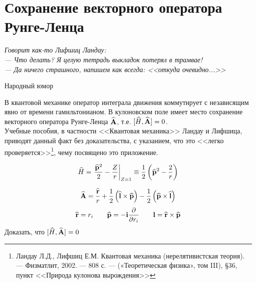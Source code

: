 \chapter{Сохранение векторного оператора Рунге-Ленца}
\label{runge}

\renewcommand{\thesection}{}
\renewcommand{\theequation}{\arabic{equation}}

\hfill \begin{minipage}[h]{0.65\textwidth}
\textit{
Говорит как-то Лифшиц Ландау:\\ 
--- Что делать? Я целую тетрадь выкладок потерял в трамвае!\\
--- Да ничего страшного, напишем как всегда: <<откуда очевидно...>>}
\begin{flushright}
Народный юмор
\end{flushright}
\end{minipage}
\vspace{0.5cm}

В квантовой механике оператор интеграла движения коммутирует с независящим явно от времени гамильтонианом. В кулоновском поле имеет место сохранение векторного оператора Рунге-Ленца $\widehat{\mathbf{A}}$, т.е. $[\widehat{H},\widehat{\mathbf{A}}] = 0$. \\
Учебные пособия, в частности <<Квантовая механика>> Ландау и Лифшица, приводят данный факт без доказательства, с указанием, что это <<легко проверяется>>\footnote{Ландау Л.Д., Лифшиц Е.М. Квантовая механика (нерелятивистская теория). — Физматлит, 2002. — 808 с. — («Теоретическая физика», том III), \S 36, пункт <<Природа кулонова вырождения>>}, чему посвящено это приложение.

\begin{stmt*}
\begin{equation}
\label{eq:1}
\widehat{H}=\left. \frac{\widehat{\mathbf{p}}^2}{2}-\frac{Z}{r} \right|_{Z=1} \equiv \frac{1}{2} \left ( {\widehat{\mathbf{p}}^2 - \frac{2}{r}} \right )
\end{equation}

\begin{equation}
\label{eq:2}
\widehat{\mathbf{A}} = \frac{\widehat{\mathbf{r}}}{r} + \frac{1}{2} \left ( {\widehat{\mathbf{l}} \times \widehat{\mathbf{p}}} \right ) - \frac{1}{2} \left ( { \widehat{\mathbf{p}} \times \widehat{\mathbf{l}}} \right )
\end{equation}
$$
\begin{array}{lll}
\widehat{\mathbf{r}} = r_i  ~~~& \displaystyle \widehat{\mathbf{p}} = -\mathbf{i} \frac{\partial{}}{\partial{r_i}}  ~~~&  \mathbf{l} = \widehat{\mathbf{r}} \times \widehat{\mathbf{p}}
\end{array}
$$
Доказать, что $[\widehat{H},\widehat{\mathbf{A}}] = 0$
\end{stmt*}

